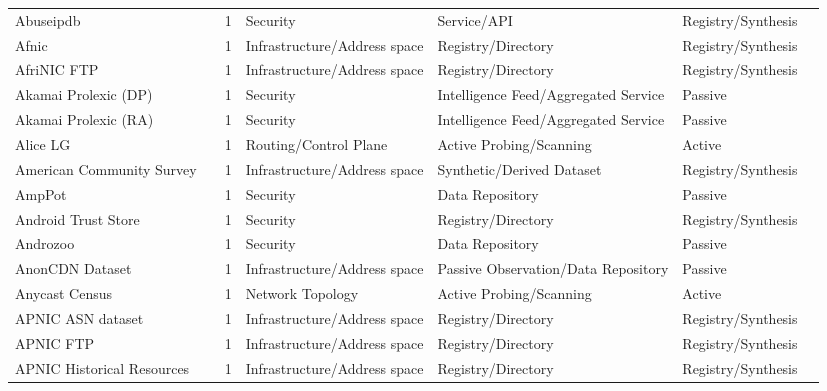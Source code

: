 \documentclass[11pt,a4paper]{article}
\begin{document}
\begin{longtable}{@{}p{}p{}p{}p{}p{}p{}p{}@{}}
Abuseipdb & \cite{abuseipdb} & 1 & Security & Service/API & Registry/Synthesis & \cite{10.1145/3777912.3839790} \\
Afnic & \cite{afnic} & 1 & Infrastructure/Address space & Registry/Directory & Registry/Synthesis & \cite{10.1007/978-3-031-85960-1_5} \\
AfriNIC FTP & \cite{afrinic_ftp} & 1 & Infrastructure/Address space & Registry/Directory & Registry/Synthesis & \cite{10.1145/3487552.3487838} \\
Akamai Prolexic (DP) & \cite{akamai_prolexic} & 1 & Security & Intelligence Feed/Aggregated Service & Passive & \cite{10.1145/3646547.3688451} \\
Akamai Prolexic (RA) & \cite{akamai_prolexic} & 1 & Security & Intelligence Feed/Aggregated Service & Passive & \cite{10.1145/3646547.3688451} \\
Alice LG & \cite{alice_lg} & 1 & Routing/Control Plane & Active Probing/Scanning & Active & \cite{10.1007/978-3-031-56252-5_10} \\
American Community Survey & \cite{american_community_survey} & 1 & Infrastructure/Address space & Synthetic/Derived Dataset & Registry/Synthesis & \cite{10.1145/3517745.3561460} \\
AmpPot & \cite{amppot} & 1 & Security & Data Repository & Passive & \cite{10.1145/3646547.3688451} \\
Android Trust Store & \cite{android_trust_store} & 1 & Security & Registry/Directory & Registry/Synthesis & \cite{10.1007/978-3-031-28486-1_4} \\
Androzoo & \cite{androzoo} & 1 & Security & Data Repository & Passive & \cite{10.1145/3646547.3688405} \\
AnonCDN Dataset & \cite{anoncdn_dataset} & 1 & Infrastructure/Address space & Passive Observation/Data Repository & Passive & \cite{10.1145/3646547.3688411} \\
Anycast Census & \cite{anycast_census} & 1 & Network Topology & Active Probing/Scanning & Active & \cite{10.1007/978-3-031-56252-5_1} \\
APNIC ASN dataset & \cite{apnic_asn} & 1 & Infrastructure/Address space & Registry/Directory & Registry/Synthesis & \cite{10.1145/3487552.3487854} \\
APNIC FTP & \cite{apnic_ftp} & 1 & Infrastructure/Address space & Registry/Directory & Registry/Synthesis & \cite{10.1145/3487552.3487838} \\
APNIC Historical Resources & \cite{apnic_erx} & 1 & Infrastructure/Address space & Registry/Directory & Registry/Synthesis & \cite{10.1145/3487552.3487838} \\

\end{longtable}
\end{document}
